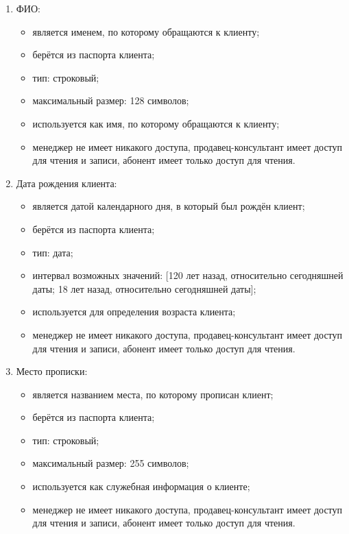 \begin{enumerate}
\begin{enumerate}
        \item ФИО:
        \begin{itemize}
            \item является именем, по которому обращаются к клиенту;
            \item берётся из паспорта клиента;
            \item тип: строковый;
            \item максимальный размер: 128 символов;
            \item используется как имя, по которому обращаются к клиенту;
            \item менеджер не имеет никакого доступа, продавец-консультант имеет доступ для чтения и записи, абонент имеет только доступ для чтения.
        \end{itemize}

        \item Дата рождения клиента:
        \begin{itemize}
            \item является датой календарного дня, в который был рождён клиент;
            \item берётся из паспорта клиента;
            \item тип: дата;
            \item интервал возможных значений: [120 лет назад, относительно сегодняшней даты; 18 лет назад, относительно сегодняшней даты];
            \item используется для определения возраста клиента;
            \item менеджер не имеет никакого доступа, продавец-консультант имеет доступ для чтения и записи, абонент имеет только доступ для чтения.
        \end{itemize}

        \item Место прописки:
        \begin{itemize}
            \item является названием места, по которому прописан клиент;
            \item берётся из паспорта клиента;
            \item тип: строковый;
            \item максимальный размер: 255 символов;
            \item используется как служебная информация о клиенте;
            \item менеджер не имеет никакого доступа, продавец-консультант имеет доступ для чтения и записи, абонент имеет только доступ для чтения.
        \end{itemize}
    \end{enumerate}



\end{enumerate}
